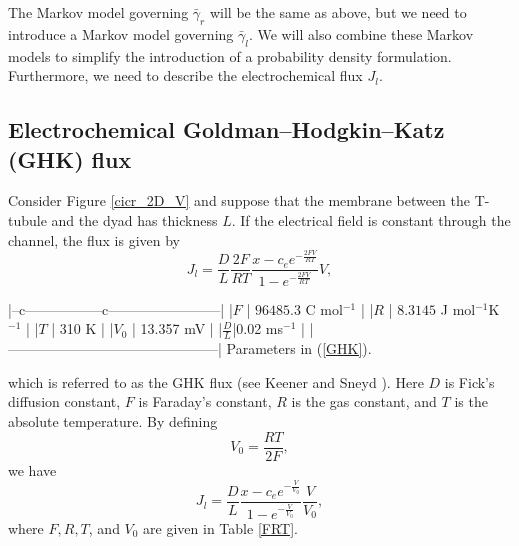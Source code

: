 The Markov model governing $\bar{\gamma}_{r}$ will be the same as above, but we need to
introduce a Markov model governing $\bar{\gamma}_{l}$. We will also combine these Markov models
to simplify the introduction of a probability density formulation. Furthermore, we need to describe the electrochemical flux $J_{l}$.

\subsection{Electrochemical Goldman--Hodgkin--Katz (GHK) flux}

Consider Figure \ref{cicr_2D_V} and suppose that the membrane between the
T-tubule and the dyad has thickness $L.$ If the electrical field is
constant through the channel, the flux is given by
\begin{equation}
J_{l}=\frac{D}{L}\frac{2F}{RT}\frac{x-c_{e}e^{-\frac{2FV}{RT}}}{1-e^{-\frac
{2FV}{RT}}}V, \label{GHK}
\end{equation}

|--c-----------------c------------------------|
|$F$          | $96485.3$ C mol$^{-1}$        |
|$R$          | $8.3145$ J mol$^{-1}$K$^{-1}$ |
|$T$          | 310 K                         |
|$V_0$        | 13.357 mV                     |
|$\frac{D}{L}$|0.02 ms$^{-1}$                 |
|---------------------------------------------|
Parameters in (\ref{GHK}).\label{FRT}

which is referred to as the GHK flux (see Keener and Sneyd \cite{KeenerSneyd}). Here $D$ is
Fick's diffusion constant, $F$ is Faraday's constant, $R$ is the gas constant,
and $T$ is the absolute temperature.
By defining
\[
V_0=\frac{RT}{2F},
\]
we have
\begin{equation}
J_{l}=\frac{D}{L}\frac{x-c_{e}e^{-\frac{V}{V_0}}}{1-e^{-\frac{V}{V_0}}}\frac{V}{V_0},\label{fluxJ}
\end{equation}
where $F,R,T$, and $V_0$ are given in Table \ref{FRT}.


